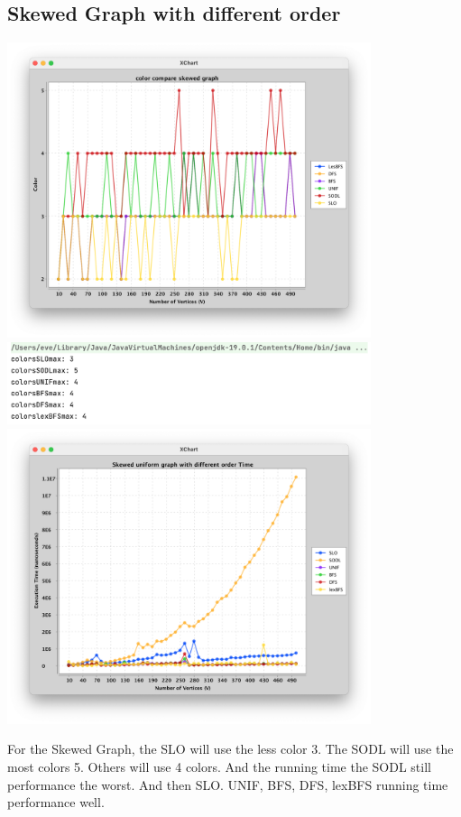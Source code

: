 \documentclass{article}
\begin{document}
\subsection{Skewed Graph with different order}
    \begin{center}
            \includegraphics[width=0.8\textwidth]{2_7.png}
            \includegraphics[width=0.8\textwidth]{2_8.png}
            \includegraphics[width=0.8\textwidth]{2t4.png}
    \end{center}    
    For the Skewed Graph, the SLO will use the less color 3. The SODL will use the most colors 5. Others will use 4 colors. And the running time the SODL still performance the worst. And then SLO. UNIF, BFS, DFS, lexBFS running time performance well.
\end{document}
